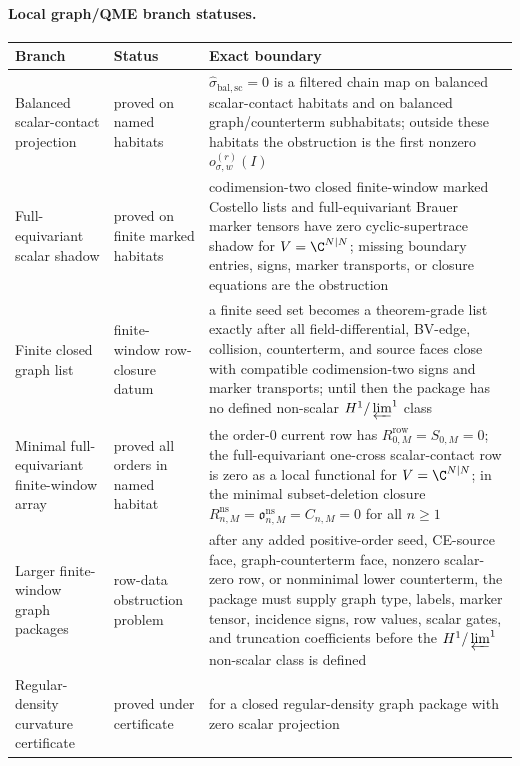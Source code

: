 \medskip
\paragraph{Local graph/QME branch statuses.}

\begin{center}
\begin{tabular}{p{}p{}p{}}
\textbf{Branch} & \textbf{Status} & \textbf{Exact boundary}\\
\hline
Balanced scalar-contact projection & proved on named habitats &
\(\widehat\sigma_{\mathrm{bal,sc}}=0\) is a filtered chain map on
balanced scalar-contact habitats and on balanced graph/counterterm
subhabitats; outside these habitats the obstruction is the first
nonzero \(o_{\sigma,w}^{(r)}(I)\)\\
Full-equivariant scalar shadow & proved on finite marked habitats &
codimension-two closed finite-window marked Costello lists and
full-equivariant Brauer marker tensors have zero cyclic-supertrace
shadow for \(V=\C^{N|N}\); missing boundary entries, signs, marker
transports, or closure equations are the obstruction\\
Finite closed graph list & finite-window row-closure datum &
a finite seed set becomes a theorem-grade list exactly after all
field-differential, BV-edge, collision, counterterm, and source faces
close with compatible codimension-two signs and marker transports; until
then the package has no defined non-scalar \(H^1/\varprojlim^1\) class\\
Minimal full-equivariant finite-window array & proved all orders in named
habitat &
the order-\(0\) current row has \(R^{\mathrm{row}}_{0,M}=S_{0,M}=0\);
the full-equivariant one-cross scalar-contact row is zero as a local
functional for \(V=\C^{N|N}\); in the minimal subset-deletion closure
\(R^{\mathrm{ns}}_{n,M}=\mathfrak o^{\mathrm{ns}}_{n,M}=C_{n,M}=0\) for
all \(n\geq1\)\\
Larger finite-window graph packages & row-data obstruction problem &
after any added positive-order seed, CE-source face, graph-counterterm
face, nonzero scalar-zero row, or nonminimal lower counterterm, the
package must supply graph type, labels, marker tensor, incidence signs,
row values, scalar gates, and truncation coefficients before the
\(H^1/\varprojlim^1\) non-scalar class is defined\\
Regular-density curvature certificate & proved under certificate &
for a closed regular-density graph package with zero scalar projection

\end{tabular}
\end{center}
